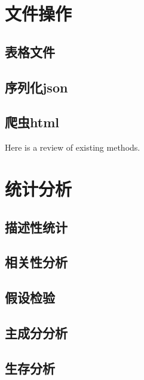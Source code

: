 \documentclass[]{book}
\begin{document}
\hypertarget{section-15}{%
\chapter{文件操作}\label{section-15}}

\hypertarget{section-16}{%
\section{表格文件}\label{section-16}}

\hypertarget{json}{%
\section{序列化json}\label{json}}

\hypertarget{html}{%
\section{爬虫html}\label{html}}

Here is a review of existing methods.

\hypertarget{section-17}{%
\chapter{统计分析}\label{section-17}}

\hypertarget{section-18}{%
\section{描述性统计}\label{section-18}}

\hypertarget{section-19}{%
\section{相关性分析}\label{section-19}}

\hypertarget{section-20}{%
\section{假设检验}\label{section-20}}

\hypertarget{section-21}{%
\section{主成分分析}\label{section-21}}

\hypertarget{section-22}{%
\section{生存分析}\label{section-22}}
\end{document}
